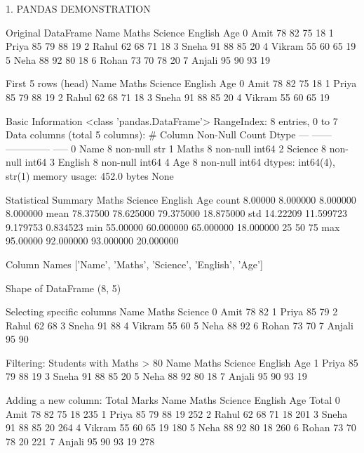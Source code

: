 1. PANDAS DEMONSTRATION

 Original DataFrame 
     Name  Maths  Science  English  Age
0    Amit     78       82       75   18
1   Priya     85       79       88   19
2   Rahul     62       68       71   18
3   Sneha     91       88       85   20
4  Vikram     55       60       65   19
5    Neha     88       92       80   18
6   Rohan     73       70       78   20
7  Anjali     95       90       93   19

 First 5 rows (head) 
     Name  Maths  Science  English  Age
0    Amit     78       82       75   18
1   Priya     85       79       88   19
2   Rahul     62       68       71   18
3   Sneha     91       88       85   20
4  Vikram     55       60       65   19

 Basic Information
<class 'pandas.DataFrame'>
RangeIndex: 8 entries, 0 to 7
Data columns (total 5 columns):
 #   Column   Non-Null Count  Dtype
---  ------   --------------  -----
 0   Name     8 non-null      str  
 1   Maths    8 non-null      int64
 2   Science  8 non-null      int64
 3   English  8 non-null      int64
 4   Age      8 non-null      int64
dtypes: int64(4), str(1)
memory usage: 452.0 bytes
None

 Statistical Summary
          Maths    Science    English        Age
count   8.00000   8.000000   8.000000   8.000000
mean   78.37500  78.625000  79.375000  18.875000
std    14.22209  11.599723   9.179753   0.834523
min    55.00000  60.000000  65.000000  18.000000
25%
50%
75%
max    95.00000  92.000000  93.000000  20.000000

 Column Names
['Name', 'Maths', 'Science', 'English', 'Age']

 Shape of DataFrame
(8, 5)

 Selecting specific columns 
     Name  Maths  Science
0    Amit     78       82
1   Priya     85       79
2   Rahul     62       68
3   Sneha     91       88
4  Vikram     55       60
5    Neha     88       92
6   Rohan     73       70
7  Anjali     95       90

 Filtering: Students with Maths > 80
     Name  Maths  Science  English  Age
1   Priya     85       79       88   19
3   Sneha     91       88       85   20
5    Neha     88       92       80   18
7  Anjali     95       90       93   19

 Adding a new column: Total Marks
     Name  Maths  Science  English  Age  Total
0    Amit     78       82       75   18    235
1   Priya     85       79       88   19    252
2   Rahul     62       68       71   18    201
3   Sneha     91       88       85   20    264
4  Vikram     55       60       65   19    180
5    Neha     88       92       80   18    260
6   Rohan     73       70       78   20    221
7  Anjali     95       90       93   19    278

